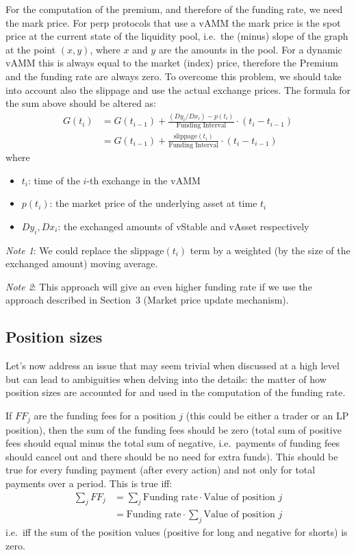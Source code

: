 \documentclass{article}
\begin{document}
For the computation of the premium, and therefore of the funding rate, we need the mark
price. For perp protocols that use a vAMM the mark price is the spot price at the current
state of the liquidity pool, i.e.\ the (minus) slope of the graph at the point $(x, y)$,
where $x$ and $y$ are the amounts in the pool. For a dynamic vAMM this is always equal to
the market (index) price, therefore the Premium and the funding rate are always zero. To
overcome this problem, we should take into account also the slippage and use the actual
exchange prices. The formula for the sum above should be altered as:
\begin{align}
G(t_i) &= G(t_{i-1}) + \frac{(Dy_i / Dx_i) - p(t_i)}{\text{Funding Interval}} \cdot (t_i - t_{i-1}) \\
        &= G(t_{i-1}) + \frac{\text{slippage}(t_i)}{\text{Funding Interval}} \cdot (t_i - t_{i-1})
\end{align}
where
\begin{itemize}
\item $t_i$: time of the $i$-th exchange in the vAMM
\item $p(t_i)$: the market price of the underlying asset at time $t_i$
\item $Dy_i, Dx_i$: the exchanged amounts of vStable and vAsset respectively
\end{itemize}

\noindent\textit{Note 1}: We could replace the $\text{slippage}(t_i)$ term by a weighted
(by the size of the exchanged amount) moving average.

\noindent\textit{Note 2}: This approach will give an even higher funding rate if we use the
approach described in Section~3 (Market price update mechanism).

\subsection{Position sizes}

Let's now address an issue that may seem trivial when discussed at a high level but can
lead to ambiguities when delving into the details: the matter of how position sizes are
accounted for and used in the computation of the funding rate.

If $FF_j$ are the funding fees for a position $j$ (this could be either a trader or an LP
position), then the sum of the funding fees should be zero (total sum of positive fees
should equal minus the total sum of negative, i.e.\ payments of funding fees should cancel
out and there should be no need for extra funds). This should be true for every funding
payment (after every action) and not only for total payments over a period. This is true
iff:
\begin{align}
\sum_j FF_j &= \sum_j \text{Funding rate} \cdot \text{Value of position } j \\
            &= \text{Funding rate} \cdot \sum_j \text{Value of position } j
\end{align}
i.e.\ iff the sum of the position values (positive for long and negative for shorts) is
zero.
\end{document}

